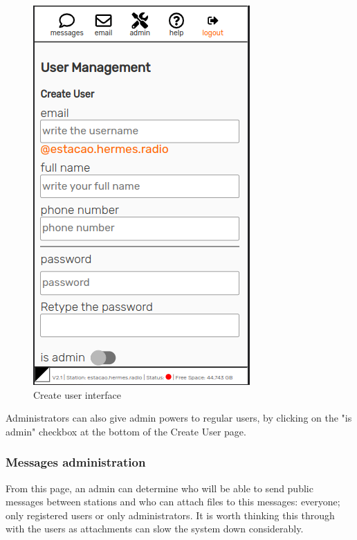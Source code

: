 \documentclass[11pt,a4paper]{article}
\begin{document}
    \begin{figure}[H]
    \centering
    \includegraphics[width=0.5\columnwidth]{screenshots/frontend/en/createuser.png}
    \caption{Create user interface}
    \label{fig:createuser}
    \end{figure}
    
    Administrators can also give admin powers to regular users, by clicking on the "is admin" checkbox at the bottom of the Create User page.

\subsubsection{Messages administration}  
\label{gui_msg_admin}

From this page, an admin can determine who will be able to send public messages between stations and who can attach files to this messages: everyone; only registered users or only administrators. It is worth thinking this through with the users as attachments can slow the system down considerably.
   
\end{document}
